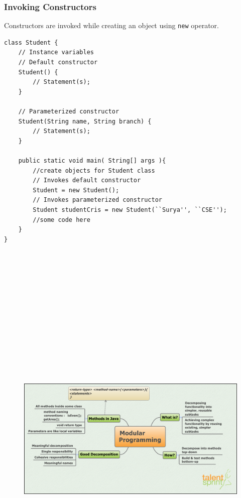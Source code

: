 \documentclass[11pt,a4paper]{article}
\begin{document}
\subsubsection*{Invoking Constructors}
Constructors are invoked while creating an object using \lstinline!new! operator.
\begin{lstlisting}
class Student {
    // Instance variables
    // Default constructor
    Student() {
        // Statement(s);
    }
    
    // Parameterized constructor
    Student(String name, String branch) {
        // Statement(s);
    }

    public static void main( String[] args ){
        //create objects for Student class
        // Invokes default constructor
        Student = new Student();
        // Invokes parameterized constructor
        Student studentCris = new Student(``Surya'', ``CSE'');
        //some code here
    }
}
\end{lstlisting}
\vfill{\ }
\begin{figure}[H]
 \begin{center}
   \includegraphics[angle=90,height=18cm, width=13cm]{ModularProgramming.png}
  
 \end{center}
 \end{figure}
\end{document}
